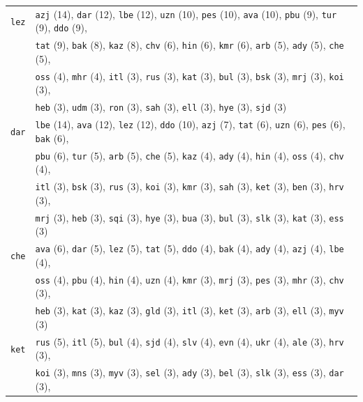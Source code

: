 \begin{center}
\begin{longtable}{ll}
\texttt{lez} & \texttt{azj} (14), \texttt{dar} (12), \texttt{lbe} (12), \texttt{uzn} (10), \texttt{pes} (10), \texttt{ava} (10), \texttt{pbu} (9), \texttt{tur} (9), \texttt{ddo} (9), \\
 & \texttt{tat} (9), \texttt{bak} (8), \texttt{kaz} (8), \texttt{chv} (6), \texttt{hin} (6), \texttt{kmr} (6), \texttt{arb} (5), \texttt{ady} (5), \texttt{che} (5), \\
 & \texttt{oss} (4), \texttt{mhr} (4), \texttt{itl} (3), \texttt{rus} (3), \texttt{kat} (3), \texttt{bul} (3), \texttt{bsk} (3), \texttt{mrj} (3), \texttt{koi} (3), \\
 & \texttt{heb} (3), \texttt{udm} (3), \texttt{ron} (3), \texttt{sah} (3), \texttt{ell} (3), \texttt{hye} (3), \texttt{sjd} (3) \\
\texttt{dar} & \texttt{lbe} (14), \texttt{ava} (12), \texttt{lez} (12), \texttt{ddo} (10), \texttt{azj} (7), \texttt{tat} (6), \texttt{uzn} (6), \texttt{pes} (6), \texttt{bak} (6), \\
 & \texttt{pbu} (6), \texttt{tur} (5), \texttt{arb} (5), \texttt{che} (5), \texttt{kaz} (4), \texttt{ady} (4), \texttt{hin} (4), \texttt{oss} (4), \texttt{chv} (4), \\
 & \texttt{itl} (3), \texttt{bsk} (3), \texttt{rus} (3), \texttt{koi} (3), \texttt{kmr} (3), \texttt{sah} (3), \texttt{ket} (3), \texttt{ben} (3), \texttt{hrv} (3), \\
 & \texttt{mrj} (3), \texttt{heb} (3), \texttt{sqi} (3), \texttt{hye} (3), \texttt{bua} (3), \texttt{bul} (3), \texttt{slk} (3), \texttt{kat} (3), \texttt{ess} (3) \\
\texttt{che} & \texttt{ava} (6), \texttt{dar} (5), \texttt{lez} (5), \texttt{tat} (5), \texttt{ddo} (4), \texttt{bak} (4), \texttt{ady} (4), \texttt{azj} (4), \texttt{lbe} (4), \\
 & \texttt{oss} (4), \texttt{pbu} (4), \texttt{hin} (4), \texttt{uzn} (4), \texttt{kmr} (3), \texttt{mrj} (3), \texttt{pes} (3), \texttt{mhr} (3), \texttt{chv} (3), \\
 & \texttt{heb} (3), \texttt{kat} (3), \texttt{kaz} (3), \texttt{gld} (3), \texttt{itl} (3), \texttt{ket} (3), \texttt{arb} (3), \texttt{ell} (3), \texttt{myv} (3) \\
\texttt{ket} & \texttt{rus} (5), \texttt{itl} (5), \texttt{bul} (4), \texttt{sjd} (4), \texttt{slv} (4), \texttt{evn} (4), \texttt{ukr} (4), \texttt{ale} (3), \texttt{hrv} (3), \\
 & \texttt{koi} (3), \texttt{mns} (3), \texttt{myv} (3), \texttt{sel} (3), \texttt{ady} (3), \texttt{bel} (3), \texttt{slk} (3), \texttt{ess} (3), \texttt{dar} (3), \\

\end{longtable}
\end{center}
